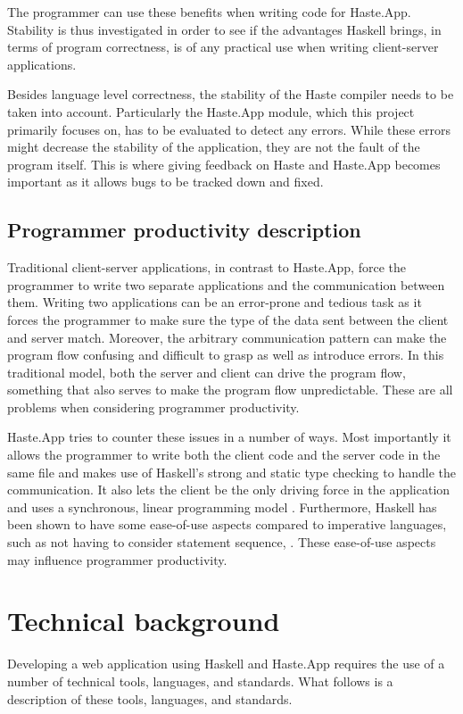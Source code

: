 \documentclass[a4paper]{article}
\begin{document}
The programmer can use these benefits when writing code for Haste.App. Stability is thus investigated in order to see if the advantages Haskell brings, in terms of program correctness, is of any practical use when writing client-server applications.

Besides language level correctness, the stability of the Haste compiler needs to be taken into account. Particularly the Haste.App module, which this project primarily focuses on, has to be evaluated to detect any errors. While these errors might decrease the stability of the application, they are not the fault of the program itself. This is where giving feedback on Haste and Haste.App becomes important as it allows bugs to be tracked down and fixed.


\subsection{Programmer productivity description}
\label{sec:programmer_productivity}
Traditional client-server applications, in contrast to Haste.App, force the programmer to write two separate applications and the communication between them. Writing two applications can be an error-prone and tedious task as it forces the programmer to make sure the type of the data sent between the client and server match. Moreover, the arbitrary communication pattern can make the program flow confusing and difficult to grasp as well as introduce errors. In this traditional model, both the server and client can drive the program flow, something that also serves to make the program flow unpredictable. These are all problems when considering programmer productivity.

Haste.App tries to counter these issues in a number of ways. Most importantly it allows the programmer to write both the client code and the server code in the same file and makes use of Haskell's strong and static type checking to handle the communication. It also lets the client be the only driving force in the application and uses a synchronous, linear programming model \cite{ekblad2015seamless}. Furthermore, Haskell has been shown to have some ease-of-use aspects compared to imperative languages, such as not having to consider statement sequence,  \cite{mathematical-comparison-haskell-c++}. These ease-of-use aspects may influence programmer productivity. 



\newpage
\section{Technical background}
Developing a web application using Haskell and Haste.App requires the use of a number of technical tools, languages, and standards. What follows is a description of these tools, languages, and standards.
\end{document}
